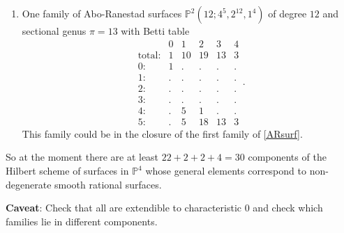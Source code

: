 \documentclass[twoside,12pt, leqno]{amsart}
\def\PP{{\mathbb P}}
\begin{document}
\begin{enumerate}
\item One family of Abo-Ranestad surfaces $\PP^{2}(12;4^{5},2^{12},1^{4})$ of degree $12$ and sectional genus $\pi=13$ with Betti table
$$
\begin{matrix}
       & 0 & 1 & 2 & 3 & 4\\
      \text{total:} & 1 & 10 & 19 & 13 & 3\\
      0: & 1 & . & . & . & .\\
      1: & . & . & . & . & .\\
      2: & . & . & . & . & .\\
      3: & . & . & . & . & .\\
      4: & . & 5 & 1 & . & .\\
      5: & . & 5 & 18 & 13 & 3
      \end{matrix}.$$
This family could be in the closure of the first family of \ref{ARsurf}.
\end{enumerate}

So at the moment there are at least $22+2+2+4=30$ components of the Hilbert scheme of surfaces in $\PP^{4}$ whose general elements correspond to non-degenerate  smooth rational surfaces.

{\bf Caveat}: Check that all are extendible to characteristic 0 and check which  families lie in different components.
\end{document}
